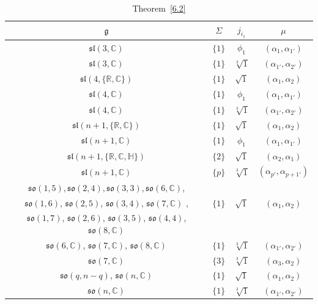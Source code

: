 \documentclass[pdftex]{sigma}
\newcommand{\fg}{\mathfrak g}
\numberwithin{equation}{section}
\begin{document}
\begin{table}[th!]\caption{Theorem~\ref{6.2}}\label{ahs1}\centering \vspace{1mm}
\begin{tabular}{|c|c|c|c|}
\hline
$\fg$ & $\Sigma$ & $j_{i_1}$ & $\mu$\\
\hline
\hline
$\mathfrak{sl}(3,\mathbb{C})$ & $\{1\}$&$\phi_1$ & $(\alpha_1,\alpha_{1'})$ \\
\hline
$\mathfrak{sl}(3,\mathbb{C})$ & $\{1\}$&$\sqrt[3]{1}$& $(\alpha_{1'},\alpha_{2'})$ \\
\hline
$\mathfrak{sl}(4,\{\mathbb{R,C}\})$ & $\{1\}$&$\sqrt{1}$& $(\alpha_1,\alpha_2)$ \\
\hline
$\mathfrak{sl}(4,\mathbb{C})$ & $\{1\}$&$\phi_1$ & $(\alpha_1,\alpha_{1'})$ \\
\hline
$\mathfrak{sl}(4,\mathbb{C})$ & $\{1\}$&$\sqrt[3]{1}$& $(\alpha_{1'},\alpha_{2'})$ \\
\hline
$\mathfrak{sl}(n+1,\{\mathbb{R,C}\})$ & $\{1\}$&$\sqrt{1}$& $(\alpha_1,\alpha_2)$ \\
\hline
$\mathfrak{sl}(n+1,\mathbb{C})$ & $\{1\}$&$\phi_1$ & $(\alpha_1,\alpha_{1'})$ \\
\hline
$\mathfrak{sl}(n+1,\{\mathbb{R, C, H}\})$ &$\{2\}$ &$\sqrt{1}$& $(\alpha_2,\alpha_1)$ \\
\hline
$\mathfrak{sl}(n+1,\mathbb{C})$ & $\{p\}$&$\sqrt[3]{1}$& $(\alpha_{p'},\alpha_{p+1'})$ \\
\hline
$\mathfrak{so}(1,5),\mathfrak{so}(2,4),\mathfrak{so}(3,3),\mathfrak{so}(6,\mathbb{C})$, & & &\\
$\mathfrak{so}(1,6)$, $\mathfrak{so}(2,5)$, $\mathfrak{so}(3,4)$, $\mathfrak{so}(7,\mathbb{C})$ , &$\{1\}$ &$\sqrt{1}$& $(\alpha_1,\alpha_2)$ \\
$\mathfrak{so}(1,7)$, $\mathfrak{so}(2,6)$, $\mathfrak{so}(3,5)$, $\mathfrak{so}(4,4)$, $\mathfrak{so}(8,\mathbb{C})$& & & \\
\hline
$\mathfrak{so}(6,\mathbb{C})$, $\mathfrak{so}(7,\mathbb{C})$, $\mathfrak{so}(8,\mathbb{C})$ & $\{1\}$&$\sqrt[3]{1}$& $(\alpha_{1'},\alpha_{2'})$ \\
\hline
$\mathfrak{so}(7,\mathbb{C})$ & $\{3\}$&$\sqrt[3]{1}$ &$(\alpha_3,\alpha_2)$\\
\hline
$\mathfrak{so}(q,n-q)$, $\mathfrak{so}(n,\mathbb{C})$ & $\{1\}$&$\sqrt{1}$ & $(\alpha_1,\alpha_2)$ \\
\hline
$\mathfrak{so}(n,\mathbb{C})$ & $\{1\}$&$\sqrt[3]{1}$& $(\alpha_{1'},\alpha_{2'})$ \\
\hline

\end{tabular}
\end{table}
\end{document}
